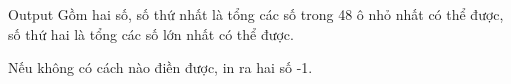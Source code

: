Output
Gồm hai số, số thứ nhất là tổng các số trong 48 ô nhỏ nhất có thể được, số thứ hai là tổng các số lớn nhất có thể được.  

   Nếu không có cách nào điền được, in ra hai số -1.